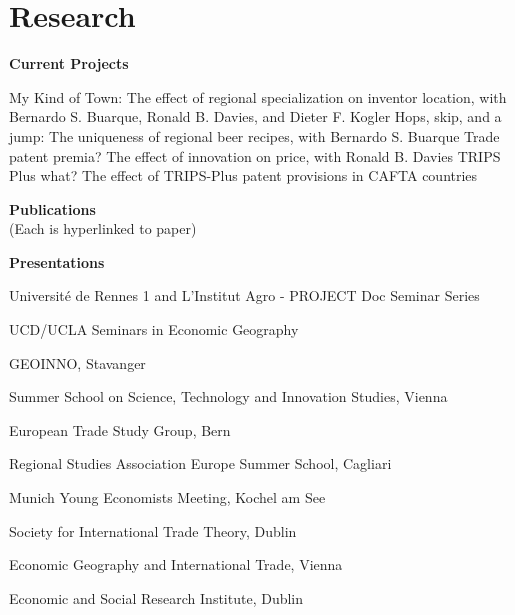 \documentclass[letterpaper]{article}
\renewenvironment{itemize}{
  \begin{list}{}{
    \setlength{\leftmargin}{1.5em}
  }
}{
  \end{list}
}
\begin{document}
\section*{Research}
\begin{itemize}
\item {\bf Current Projects}

\leftskip 0.5in
\parindent -0.5in
\subitem My Kind of Town: The effect of regional specialization on inventor location, with Bernardo S. Buarque, Ronald B. Davies, and Dieter F. Kogler
\subitem Hops, skip, and a jump: The uniqueness of regional beer recipes, with Bernardo S. Buarque
\subitem Trade patent premia? The effect of innovation on price, with Ronald B. Davies
\subitem TRIPS Plus what? The effect of TRIPS-Plus patent provisions in CAFTA countries
\\


\leftskip 0in
\item {\bf Publications}\\
(Each is hyperlinked to paper)
\leftskip 0.5in
\parindent -0.5in

\leftskip 0.5in
\parindent -0.5in

\leftskip 0in

\item {\bf Presentations}
\item{Université de Rennes 1 and L'Institut Agro - PROJECT Doc Seminar Series}
\item{UCD/UCLA Seminars in Economic Geography}
\item{GEOINNO, Stavanger}

\pagebreak

\begin{itemize}
\item{Summer School on Science, Technology and Innovation Studies, Vienna}
\item{European Trade Study Group, Bern}
\item{Regional Studies Association Europe Summer School, Cagliari}
\item{Munich Young Economists Meeting, Kochel am See}
\item{Society for International Trade Theory, Dublin}
\item{Economic Geography and International Trade, Vienna}
\end{itemize}
\begin{itemize}
\item{Economic and Social Research Institute, Dublin}
\end{itemize}
\leftskip 0.5in
\parindent -0.5in


\end{itemize}
\end{document}
